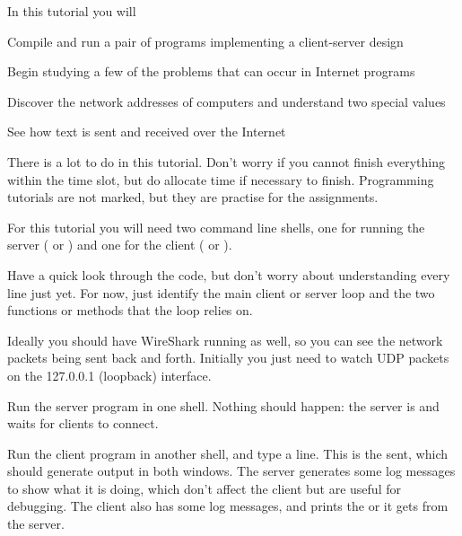 










In this tutorial you will

\DOT Compile and run a pair of programs implementing a client-server design

\DOT Begin studying a few of the problems that can occur in Internet programs

\DOT Discover the network addresses of computers and understand two special values

\DOT See how text is sent and received over the Internet

\begin{IMPORTANT}
There is a lot to do in this tutorial. Don't worry if you cannot finish everything
within the time slot, but do allocate time if necessary to finish. Programming
tutorials are not marked, but they are practise for the assignments.
\end{IMPORTANT}



For this tutorial you will need two command line shells, one for running
the server ( or ) and one for the client
( or ).

Have a quick look through the code, but don't worry about understanding every
line just yet. For now, just identify the main client or server loop and the two
functions or methods that the loop relies on.

Ideally you should have WireShark running as well, so you can see the network
packets being sent back and forth. Initially you just need to watch UDP packets
on the 127.0.0.1 (loopback) interface.

Run the server program in one shell. Nothing should happen: the server is 
and waits for clients to connect.

Run the client program in another shell, and type a line. This is the 
sent, which should generate output in both windows.
The server generates some log messages to show what it is doing, which don't affect
the client but are useful for debugging. The client also has some log messages, and
prints the  or  it gets from the server.

